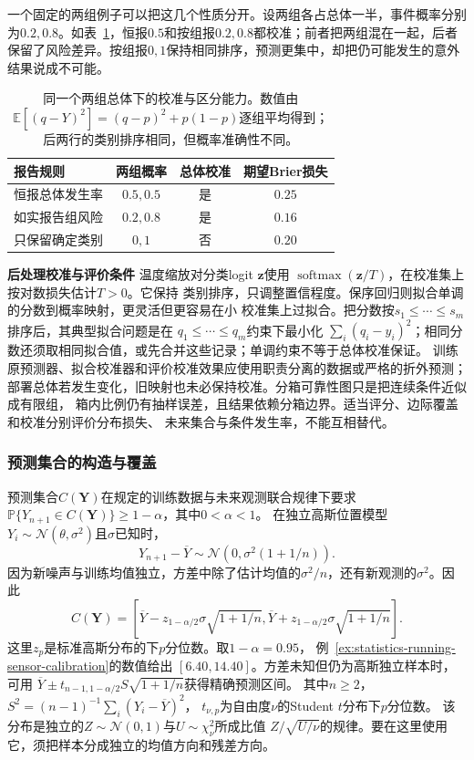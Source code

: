 一个固定的两组例子可以把这几个性质分开。设两组各占总体一半，事件概率分别为\(0.2,0.8\)。如表~\ref{tab:statistics-calibration-discrimination}，恒报\(0.5\)和按组报\(0.2,0.8\)都校准；前者把两组混在一起，后者保留了风险差异。按组报\(0,1\)保持相同排序，预测更集中，却把仍可能发生的意外结果说成不可能。
\begin{table}[htbp]
  \centering
  \small
  \begin{tabular}{lccc}
    \toprule
    报告规则 & 两组概率 & 总体校准 & 期望Brier损失 \\
    \midrule
    恒报总体发生率 & \(0.5,0.5\) & 是 & \(0.25\) \\
    如实报告组风险 & \(0.2,0.8\) & 是 & \(0.16\) \\
    只保留确定类别 & \(0,1\) & 否 & \(0.20\) \\
    \bottomrule
  \end{tabular}
  \caption{同一个两组总体下的校准与区分能力。数值由\(\mathbb E[(q-Y)^2]=(q-p)^2+p(1-p)\)逐组平均得到；后两行的类别排序相同，但概率准确性不同。}
  \label{tab:statistics-calibration-discrimination}
\end{table}

\par\medskip\noindent\textbf{后处理校准与评价条件}\quad
温度缩放对分类logit \(\bm z\)使用
\(\operatorname{softmax}(\bm z/T)\)，在校准集上按对数损失估计\(T>0\)。它保持
类别排序，只调整置信程度。保序回归则拟合单调的分数到概率映射，更灵活但更容易在小
校准集上过拟合。把分数按\(s_1\leq\cdots\leq s_m\)排序后，其典型拟合问题是在
\(q_1\leq\cdots\leq q_m\)约束下最小化
\(\sum_i(q_i-y_i)^2\)；相同分数还须取相同拟合值，或先合并这些记录；单调约束不等于总体校准保证。
训练原预测器、拟合校准器和评价校准效果应使用职责分离的数据或严格的折外预测；
部署总体若发生变化，旧映射也未必保持校准。分箱可靠性图只是把连续条件近似成有限组，
箱内比例仍有抽样误差，且结果依赖分箱边界。适当评分、边际覆盖和校准分别评价分布损失、
未来集合与条件发生率，不能互相替代。

\subsubsection{预测集合的构造与覆盖}
\label{sec:probability-exchangeability-conformal-ranks}
\label{sec:rv-prediction-sets}
预测集合\(C(\bm Y)\)在规定的训练数据与未来观测联合规律下要求
\(\mathbb P\{Y_{n+1}\in C(\bm Y)\}\geq1-\alpha\)，其中\(0<\alpha<1\)。
在独立高斯位置模型\(Y_i\sim\mathcal N(\theta,\sigma^2)\)且\(\sigma\)已知时，
\[
Y_{n+1}-\overline Y\sim\mathcal N(0,\sigma^2(1+1/n)).
\]
因为新噪声与训练均值独立，方差中除了估计均值的\(\sigma^2/n\)，还有新观测的\(\sigma^2\)。因此
\[
C(\bm Y)=\left[\overline Y-z_{1-\alpha/2}\sigma\sqrt{1+1/n},
\overline Y+z_{1-\alpha/2}\sigma\sqrt{1+1/n}\right].
\]
这里\(z_p\)是标准高斯分布的下\(p\)分位数。取\(1-\alpha=0.95\)，
例~\ref{ex:statistics-running-sensor-calibration}的数值给出
\([6.40,14.40]\)。方差未知但仍为高斯独立样本时，可用
\(\overline Y\pm t_{n-1,1-\alpha/2}S\sqrt{1+1/n}\)获得精确预测区间。
其中\(n\geq2\)，\(S^2=(n-1)^{-1}\sum_i(Y_i-\overline Y)^2\)，
\(t_{\nu,p}\)为自由度\(\nu\)的Student \(t\)分布下\(p\)分位数。
该分布是独立的\(Z\sim\mathcal N(0,1)\)与\(U\sim\chi_\nu^2\)所成比值
\(Z/\sqrt{U/\nu}\)的规律。要在这里使用它，须把样本分成独立的均值方向和残差方向。

